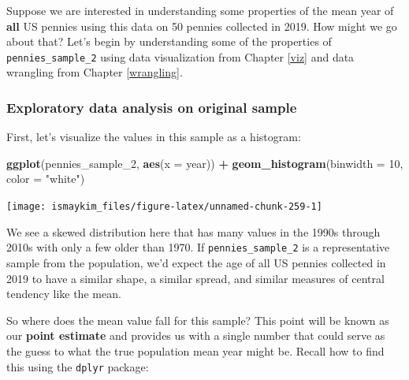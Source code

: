 \documentclass[12pt, krantz2,]{krantz}
\makeatletter
\newenvironment{Shaded}{\begin{snugshade}}{\end{snugshade}}
\newcommand{\DataTypeTok}[1]{\textcolor[rgb]{0.27,0.27,0.27}{#1}}
\newcommand{\DecValTok}[1]{\textcolor[rgb]{0.06,0.06,0.06}{#1}}
\newcommand{\KeywordTok}[1]{\textcolor[rgb]{0.27,0.27,0.27}{\textbf{#1}}}
\newcommand{\NormalTok}[1]{#1}
\newcommand{\OperatorTok}[1]{\textcolor[rgb]{0.43,0.43,0.43}{\textbf{#1}}}
\newcommand{\StringTok}[1]{\textcolor[rgb]{0.5,0.5,0.5}{#1}}
\newenvironment{kframe}{%
\medskip{}
\setlength{\fboxsep}{.8em}
 \def\at@end@of@kframe{}%
 \ifinner\ifhmode%
  \def\at@end@of@kframe{\end{minipage}}%
  \begin{minipage}{\columnwidth}%
 \fi\fi%
 \def\FrameCommand##1{\hskip\@totalleftmargin \hskip-\fboxsep
 \colorbox{shadecolor}{##1}\hskip-\fboxsep
     \hskip-\linewidth \hskip-\@totalleftmargin \hskip\columnwidth}%
 \MakeFramed {\advance\hsize-\width
   \@totalleftmargin\z@ \linewidth\hsize
   \@setminipage}}%
 {\par\unskip\endMakeFramed%
 \at@end@of@kframe}
\renewenvironment{Shaded}{\begin{kframe}}{\end{kframe}}
\makeatother
\begin{document}
Suppose we are interested in understanding some properties of the mean year of \textbf{all} US pennies using this data on 50 pennies collected in 2019. How might we go about that? Let's begin by understanding some of the properties of \texttt{pennies\_sample\_2} using data visualization from Chapter \ref{viz} and data wrangling from Chapter \ref{wrangling}.

\hypertarget{exploratory-data-analysis-on-original-sample}{%
\subsubsection*{Exploratory data analysis on original sample}\label{exploratory-data-analysis-on-original-sample}}


First, let's visualize the values in this sample as a histogram:

\begin{Shaded}
\begin{Highlighting}[]
\KeywordTok{ggplot}\NormalTok{(pennies_sample_}\DecValTok{2}\NormalTok{, }\KeywordTok{aes}\NormalTok{(}\DataTypeTok{x =}\NormalTok{ year)) }\OperatorTok{+}
\StringTok{  }\KeywordTok{geom_histogram}\NormalTok{(}\DataTypeTok{binwidth =} \DecValTok{10}\NormalTok{, }\DataTypeTok{color =} \StringTok{"white"}\NormalTok{)}
\end{Highlighting}
\end{Shaded}

\begin{center}\texttt{[image: ismaykim\_files/figure-latex/unnamed-chunk-259-1]} \end{center}

We see a skewed distribution here that has many values in the 1990s through 2010s with only a few older than 1970. If \texttt{pennies\_sample\_2} is a representative sample from the population, we'd expect the age of all US pennies collected in 2019 to have a similar shape, a similar spread, and similar measures of central tendency like the mean.

So where does the mean value fall for this sample? This point will be known as our \textbf{point estimate} and provides us with a single number that could serve as the guess to what the true population mean year might be. Recall how to find this using the \texttt{dplyr} package:

\begin{Shaded}
\end{Shaded}
\end{document}
